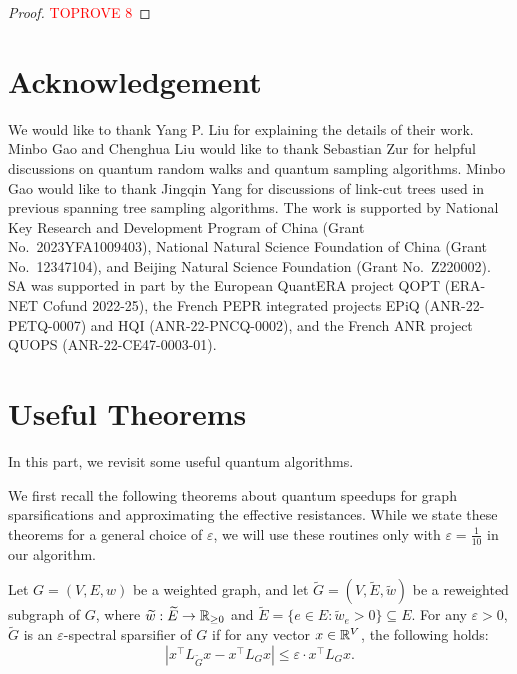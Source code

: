 \documentclass[11pt]{article}
\newcommand{\abss}[1]{\left\lvert #1 \right\rvert}
\newcommand{\parens}[1]{( #1 )}
\newcommand{\sets}[1]{\{ #1 \}}
\begin{document}
{\lowerbound*
\begin{proof}\textcolor{red}{TOPROVE 8}\end{proof}

\section*{Acknowledgement}\label{sec:ack}

We would like to thank Yang P. Liu for explaining the details of their work.
Minbo Gao and Chenghua Liu would like to thank
Sebastian Zur
for helpful discussions on quantum random walks and quantum sampling algorithms. 
Minbo Gao would like to thank
Jingqin Yang for discussions
of link-cut trees used in previous spanning tree sampling algorithms.
The work is supported by National Key Research and Development Program of China
(Grant No.\ 2023YFA1009403), National Natural Science Foundation of China (Grant
No.\ 12347104), and Beijing Natural Science Foundation (Grant No.\ Z220002).
SA was supported in part by the European QuantERA project QOPT (ERA-NET Cofund 2022-25), the French PEPR integrated projects EPiQ (ANR-22-PETQ-0007) and HQI (ANR-22-PNCQ-0002), and the French ANR project QUOPS (ANR-22-CE47-0003-01).





\appendix


\section{Useful Theorems}

In this part, we revisit some useful
quantum algorithms.

We first recall the following theorems 
about quantum speedups for graph sparsifications
and approximating the effective resistances.
While we state these theorems for a general choice of $\varepsilon$, we will use these routines only with $\varepsilon = \frac{1}{10}$ in our algorithm.


\begin{definition}\label{def:graph-spectral-sparsifier}
	Let $ G=\parens{V,E,w}$ be a weighted graph, and let $\tilde G =\parens{V,\tilde E, \tilde w}$ be a reweighted
	subgraph of $G$, where $\widetilde{w}:\widetilde{E}\rightarrow \mathbb{R}_{\geq 0}$ and
	$\tilde E= \sets{e\in E: \tilde w_e>0} \subseteq E$.
	For any $\varepsilon >0$, $\tilde G $ is an $\varepsilon$-spectral sparsifier
	of $G$ if for any vector $x\in \mathbb{R}^V$, the following holds:
	\begin{equation*}
		\abss{x ^\top  L_ {\tilde G}x  -x ^\top L_ { G}  x} \leq
		\varepsilon \cdot x ^\top L_ { G}  x.
	\end{equation*}
\end{definition}


}
\end{document}
